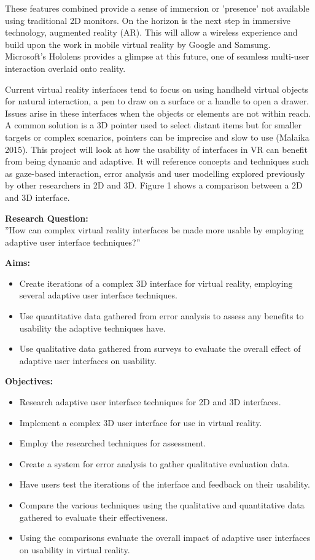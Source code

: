 \documentclass[11pt]{article}
\begin{document}
These features combined provide a sense of immersion or 'presence' not available using traditional 2D monitors. On the horizon is the next step in immersive technology, augmented reality (AR). This will allow a wireless experience and build upon the work in mobile virtual reality by Google and Samsung. Microsoft's Hololens provides a glimpse at this future, one of seamless multi-user interaction overlaid onto reality.

Current virtual reality interfaces tend to focus on using handheld virtual objects for natural interaction, a pen to draw on a surface or a handle to open a drawer. Issues arise in these interfaces when the objects or elements are not within reach. A common solution is a 3D pointer used to select distant items but for smaller targets or complex scenarios, pointers can be imprecise and slow to use (Malaika 2015). This project will look at how the usability of interfaces in VR can benefit from being dynamic and adaptive. It will reference concepts and techniques such as gaze-based interaction, error analysis and user modelling explored previously by other researchers in 2D and 3D. Figure 1 shows a comparison between a 2D and 3D interface.

\textbf{Research Question:} \\
''How can complex virtual reality interfaces be made more usable by employing adaptive user interface techniques?''

\textbf{Aims:}
\begin{itemize}[noitemsep,topsep=0pt]
\item Create iterations of a complex 3D interface for virtual reality, employing several adaptive user interface techniques.
\item Use quantitative data gathered from error analysis to assess any benefits to usability the adaptive techniques have.
\item Use qualitative data gathered from surveys to evaluate the overall effect of adaptive user interfaces on usability.
\end{itemize}
\textbf{Objectives:}
\begin{itemize}[noitemsep,topsep=0pt]
\item Research adaptive user interface techniques for 2D and 3D interfaces.
\item Implement a complex 3D user interface for use in virtual reality.
\item Employ the researched techniques for assessment.
\item Create a system for error analysis to gather qualitative evaluation data.
\item Have users test the iterations of the interface and feedback on their usability.
\item Compare the various techniques using the qualitative and quantitative data gathered to evaluate their effectiveness.
\item Using the comparisons evaluate the overall impact of adaptive user interfaces on usability in virtual reality.
\end{itemize}
\end{document}
